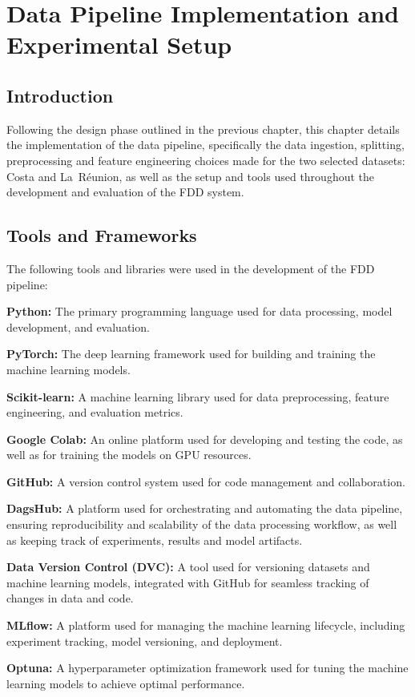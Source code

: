 \chapter{Data Pipeline Implementation and Experimental Setup}

\section{Introduction}

Following the design phase outlined in the previous chapter, this chapter details the implementation of the data pipeline, specifically the data ingestion, splitting, preprocessing and
feature engineering choices made for the two selected datasets: Costa and La~Réunion, as well as the setup and tools used throughout the development and evaluation of the FDD system.

\section{Tools and Frameworks}
The following tools and libraries were used in the development of the FDD pipeline:
\par\noindent\textbf{Python:} The primary programming language used for data processing, model development, and evaluation.

\par\noindent\textbf{PyTorch:} The deep learning framework used for building and training the machine learning models.

\par\noindent\textbf{Scikit-learn:} A machine learning library used for data preprocessing, feature engineering, and evaluation metrics.

\par\noindent\textbf{Google Colab:} An online platform used for developing and testing the code, as well as for training the models on GPU resources.
\par\noindent\textbf{GitHub:} A version control system used for code management and collaboration.
\par\noindent\textbf{DagsHub:} A platform used for orchestrating and automating the data pipeline, ensuring reproducibility and scalability of the data processing workflow, as well as keeping track of experiments, results and model artifacts.
\par\noindent\textbf{Data Version Control (DVC):} A tool used for versioning datasets and machine learning models, integrated with GitHub for seamless tracking of changes in data and code.
\par\noindent\textbf{MLflow:} A platform used for managing the machine learning lifecycle, including experiment tracking, model versioning, and deployment.
\par\noindent\textbf{Optuna:} A hyperparameter optimization framework used for tuning the machine learning models to achieve optimal performance.


